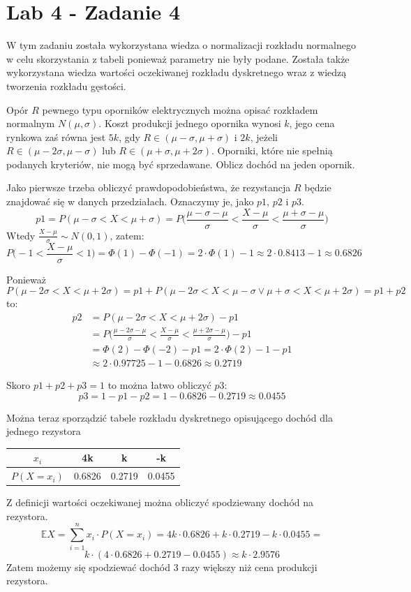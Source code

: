 \documentclass{article}
\begin{document}
{\section{Lab 4 - Zadanie 4}
W tym zadaniu została wykorzystana wiedza o normalizacji rozkładu normalnego w celu skorzystania z tabeli ponieważ parametry nie były podane. Została także wykorzystana wiedza wartości oczekiwanej rozkładu dyskretnego wraz z wiedzą tworzenia rozkładu gęstości. \\ \par

Opór $R$ pewnego typu oporników elektrycznych można opisać rozkładem normalnym $N(\mu,\sigma)$. Koszt produkcji jednego opornika wynosi $k$, jego cena rynkowa zaś równa jest $5k$, gdy $R\in(\mu - \sigma,\mu + \sigma)$ i $2k$, jeżeli $R\in(\mu-2\sigma,\mu-\sigma)$ lub $R\in(\mu+\sigma,\mu+2\sigma)$. Oporniki, które nie spełnią podanych kryteriów, nie mogą być sprzedawane. Oblicz dochód na jeden opornik.
\\
\par
Jako pierwsze trzeba obliczyć prawdopodobieństwa, że rezystancja $R$ będzie znajdować się w danych przedziałach. Oznaczymy je, jako $p1$, $p2$ i $p3$.
$$p1 = P(\mu - \sigma< X < \mu + \sigma) = P\Big(\frac{\mu - \sigma - \mu}{\sigma} < \frac{X-\mu}{\sigma} < \frac{\mu + \sigma - \mu}{\sigma}\Big)$$
Wtedy $\frac{X-\mu}{\sigma} \sim N(0,1)$, zatem:
$$P\Big(-1<\frac{X-\mu}{\sigma}<1\Big) = \Phi(1) - \Phi(-1) = 2\cdot\Phi(1) - 1 \approx 2\cdot0.8413 - 1 \approx 0.6826$$
\par
Ponieważ 
$$P(\mu-2\sigma<X<\mu+2\sigma) = p1 + P(\mu-2\sigma<X<\mu-\sigma \vee \mu+\sigma<X<\mu+2\sigma) = p1 + p2$$
to:
\begin{align*}
p2 & = P(\mu-2\sigma<X<\mu+2\sigma) - p1 \\
& = P\Big(\frac{\mu - 2\sigma - \mu}{\sigma}<\frac{X-\mu}{\sigma}<\frac{\mu+2\sigma-\mu}{\sigma}\Big) - p1 \\
& = \Phi(2) - \Phi(-2) - p1 = 2\cdot\Phi(2) - 1 - p1 \\
& \approx 2\cdot0.97725 - 1 - 0.6826 \approx 0.2719
\end{align*}
\par
Skoro $p1 + p2 + p3 = 1$ to można łatwo obliczyć $p3$:
$$p3 = 1 - p1 - p2 = 1 - 0.6826 - 0.2719 \approx 0.0455$$

\par
Można teraz sporządzić tabele rozkładu dyskretnego opisującego dochód dla jednego rezystora
\begin{center}
\begin{tabular}{|c|c|c|c|}
\hline
$x_i$ & 4k & k & -k \\
\hline
$P(X = x_i)$ & 0.6826 & 0.2719 & 0.0455\\
\hline
\end{tabular}
\end{center}
\par
Z definicji wartości oczekiwanej można obliczyć spodziewany dochód na rezystora.
$$\mathbb{E}X = \sum_{i=1}^{n}x_i\cdot P(X=x_i) = 4k\cdot0.6826 + k\cdot0.2719 - k\cdot0.0455 =$$
$$k\cdot(4\cdot0.6826 + 0.2719 - 0.0455) \approx k\cdot 2.9576$$
Zatem możemy się spodziewać dochód 3 razy większy niż cena produkcji rezystora.

}
\end{document}
